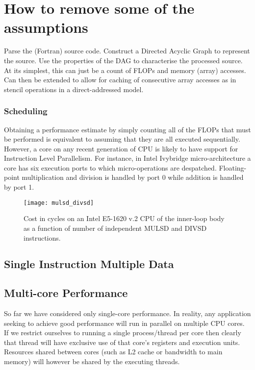 \documentclass[12pt]{article}
\begin{document}
\section{How to remove some of the assumptions}

Parse the (Fortran) source code.  Construct a Directed Acyclic Graph
to represent the source.  Use the properties of the DAG to
characterise the processed source.  At its simplest, this can just be
a count of FLOPs and memory (array) accesses.  Can then be extended to
allow for caching of consecutive array accesses as in stencil
operations in a direct-addressed model.

\subsubsection{Scheduling}

Obtaining a performance estimate by simply counting all of the FLOPs
that must be performed is equivalent to assuming that they are all
executed sequentially. However, a core on any recent generation of CPU
is likely to have support for Instruction Level Parallelism. For
instance, in Intel Ivybridge micro-architecture a core has six
execution ports to which micro-operations are
despatched. Floating-point multiplication and division is handled by
port 0 while addition is handled by port 1.

\begin{figure}
\texttt{[image: mulsd\_divsd]}
\caption{Cost in cycles on an Intel E5-1620 v.2 CPU of the inner-loop
  body as a function of number of independent MULSD and DIVSD
  instructions.}
\label{FIG_mul_div_overlap}
\end{figure}

\subsection{Single Instruction Multiple Data}

\subsection{Multi-core Performance}

So far we have considered only single-core performance. In reality,
any application seeking to achieve good performance will run in
parallel on multiple CPU cores.  If we restrict ourselves to running a
single process/thread per core then clearly that thread will have
exclusive use of that core's registers and execution units. Resources
shared between cores (such as L2 cache or bandwidth to main memory) will
however be shared by the executing threads.
\end{document}
